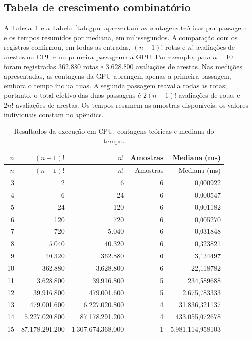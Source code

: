 \documentclass[12pt,a4paper]{article}
\begin{document}
\subsection{Tabela de crescimento combinatório}

A Tabela~\ref{tab:cpu} e a Tabela~\ref{tab:gpu} apresentam as contagens teóricas por passagem e os tempos resumidos por mediana, em milissegundos. A comparação com os registros confirmou, em todas as entradas, $(n-1)!$ rotas e $n!$ avaliações de arestas na CPU e na primeira passagem da GPU. Por exemplo, para $n=10$ foram registradas 362.880 rotas e 3.628.800 avaliações de arestas. Nas medições apresentadas, as contagens da GPU abrangem apenas a primeira passagem, embora o tempo inclua duas. A segunda passagem reavalia todas as rotas; portanto, o total efetivo das duas passagens é $2(n-1)!$ avaliações de rotas e $2n!$ avaliações de arestas. Os tempos resumem as amostras disponíveis; os valores individuais constam no apêndice.

\begin{longtable}{rrrrr}
\caption{Resultados da execução em CPU: contagens teóricas e mediana do tempo.}\label{tab:cpu}\\
\toprule
$n$ & $(n-1)!$ & $n!$ & Amostras & Mediana (ms) \\
\midrule
\endfirsthead
\toprule
$n$ & $(n-1)!$ & $n!$ & Amostras & Mediana (ms) \\
\midrule
\endhead
3 & 2 & 6 & 6 & 0,000922 \\
4 & 6 & 24 & 6 & 0,000547 \\
5 & 24 & 120 & 6 & 0,001182 \\
6 & 120 & 720 & 6 & 0,005270 \\
7 & 720 & 5.040 & 6 & 0,031848 \\
8 & 5.040 & 40.320 & 6 & 0,323821 \\
9 & 40.320 & 362.880 & 6 & 3,124497 \\
10 & 362.880 & 3.628.800 & 6 & 22,118782 \\
11 & 3.628.800 & 39.916.800 & 5 & 234,589688 \\
12 & 39.916.800 & 479.001.600 & 5 & 2.675,783333 \\
13 & 479.001.600 & 6.227.020.800 & 4 & 31.836,321137 \\
14 & 6.227.020.800 & 87.178.291.200 & 4 & 433.055,072678 \\
15 & 87.178.291.200 & 1.307.674.368.000 & 1 & 5.981.114,958103 \\
\bottomrule
\end{longtable}
\end{document}
